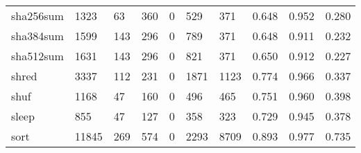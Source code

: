 \begin{longtable}{lp{2.0cm}p{2.0cm}p{2.0cm}p{2.0cm}p{2.0cm}p{2.0cm}p{2.0cm}p{2.0cm}p{2.0cm}}
sha256sum &                   1323 &                                 63 &                               360 &                                0 &                               529 &                             371 &                                   0.648 &                                  0.952 &                                0.280 \\
sha384sum &                   1599 &                                143 &                               296 &                                0 &                               789 &                             371 &                                   0.648 &                                  0.911 &                                0.232 \\
sha512sum &                   1631 &                                143 &                               296 &                                0 &                               821 &                             371 &                                   0.650 &                                  0.912 &                                0.227 \\
shred     &                   3337 &                                112 &                               231 &                                0 &                              1871 &                            1123 &                                   0.774 &                                  0.966 &                                0.337 \\
shuf      &                   1168 &                                 47 &                               160 &                                0 &                               496 &                             465 &                                   0.751 &                                  0.960 &                                0.398 \\
sleep     &                    855 &                                 47 &                               127 &                                0 &                               358 &                             323 &                                   0.729 &                                  0.945 &                                0.378 \\
sort      &                  11845 &                                269 &                               574 &                                0 &                              2293 &                            8709 &                                   0.893 &                                  0.977 &                                0.735 \\

\end{longtable}
